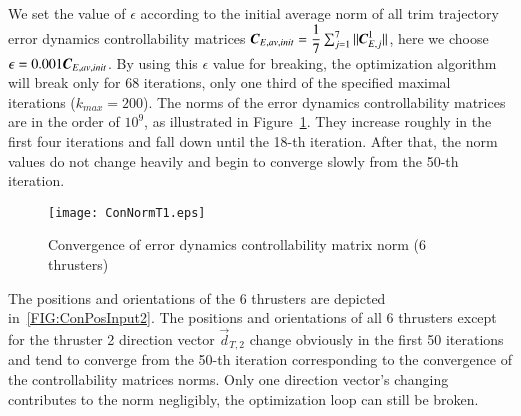 We set the value of $\epsilon$ according to the initial average norm of all trim trajectory error dynamics controllability matrices $\emph{\textbf{C}}_{E,av,init}=\dfrac{1}{7}\sum_{j=1}^{7}||\emph{\textbf{C}}_{E,j}^{1}||$, here we choose $\epsilon=0.001\emph{\textbf{C}}_{E,av,init}$. By using this $\epsilon$ value for breaking, the optimization algorithm will break only for 68 iterations, only one third of the specified maximal iterations ($k_{max}=200$). The norms of the error dynamics controllability matrices are in the order of $10^{9}$, as illustrated in Figure~\ref{FIG:ConNormT1}. They increase roughly in the first four iterations and fall down until the 18-th iteration. After that, the norm values do not change heavily and begin to converge slowly from the 50-th iteration.
\begin{figure}
\centering
\texttt{[image: ConNormT1.eps]}
\caption{Convergence of error dynamics controllability matrix norm (6 thrusters)}	
\label{FIG:ConNormT1}
\end{figure}
The positions and orientations of the 6 thrusters are depicted in~\ref{FIG:ConPosInput2}. The positions and orientations of all 6 thrusters except for the thruster 2 direction vector $\vec{d}_{T,2}$ change obviously in the first 50 iterations and tend to converge from the 50-th iteration corresponding to the convergence of the controllability matrices norms. Only one direction vector's changing contributes to the norm negligibly, the optimization loop can still be broken. 

